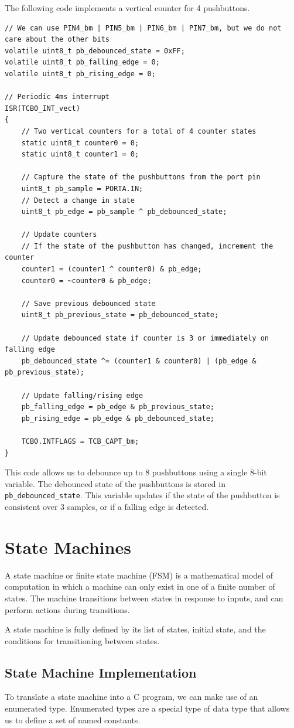 \documentclass{report}
\begin{document}
The following code implements a vertical counter for 4 pushbuttons.
\begin{verbatim}
// We can use PIN4_bm | PIN5_bm | PIN6_bm | PIN7_bm, but we do not care about the other bits
volatile uint8_t pb_debounced_state = 0xFF;
volatile uint8_t pb_falling_edge = 0;
volatile uint8_t pb_rising_edge = 0;

// Periodic 4ms interrupt
ISR(TCB0_INT_vect)
{
    // Two vertical counters for a total of 4 counter states
    static uint8_t counter0 = 0;
    static uint8_t counter1 = 0;

    // Capture the state of the pushbuttons from the port pin
    uint8_t pb_sample = PORTA.IN;
    // Detect a change in state
    uint8_t pb_edge = pb_sample ^ pb_debounced_state;

    // Update counters
    // If the state of the pushbutton has changed, increment the counter
    counter1 = (counter1 ^ counter0) & pb_edge;
    counter0 = ~counter0 & pb_edge;

    // Save previous debounced state
    uint8_t pb_previous_state = pb_debounced_state;

    // Update debounced state if counter is 3 or immediately on falling edge
    pb_debounced_state ^= (counter1 & counter0) | (pb_edge & pb_previous_state);

    // Update falling/rising edge
    pb_falling_edge = pb_edge & pb_previous_state;
    pb_rising_edge = pb_edge & pb_debounced_state;

    TCB0.INTFLAGS = TCB_CAPT_bm;
}
\end{verbatim}
This code allows us to debounce up to 8 pushbuttons using a single 8-bit
variable. The debounced state of the pushbuttons is stored in \texttt{pb_debounced_state}.
This variable updates if the state of the pushbutton is consistent over 3 samples,
or if a falling edge is detected.
\chapter{State Machines}
A state machine or finite state machine (FSM) is a mathematical model of computation in which a machine can only exist in one of a finite
number of states. The machine transitions between states in response to inputs, and can perform actions during transitions.

A state machine is fully defined by its list of states, initial state,
and the conditions for transitioning between states.
\section{State Machine Implementation}
To translate a state machine into a C program, we can make use of an enumerated type.
Enumerated types are a special type of data type that allows us to define a set of named constants.
\end{document}
